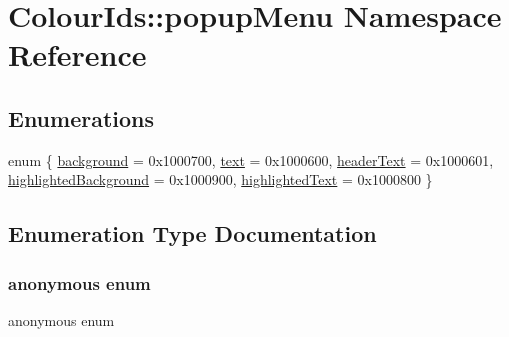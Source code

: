 \hypertarget{namespaceColourIds_1_1popupMenu}{}\section{Colour\+Ids\+:\+:popup\+Menu Namespace Reference}
\label{namespaceColourIds_1_1popupMenu}
\subsection*{Enumerations}
\begin{DoxyCompactItemize}
\item 
enum \{ \newline
\mbox{\hyperlink{namespaceColourIds_1_1popupMenu_ad98555b670c9a9fc093acf5ecaf4fc13a65c427e71c7fdfe391c4f686d64aa4b6}{background}} = 0x1000700, 
\mbox{\hyperlink{namespaceColourIds_1_1popupMenu_ad98555b670c9a9fc093acf5ecaf4fc13a250d63c798ce32b3191ec1a988523d51}{text}} = 0x1000600, 
\mbox{\hyperlink{namespaceColourIds_1_1popupMenu_ad98555b670c9a9fc093acf5ecaf4fc13abf95002460861cca2ca6e1b28d2ad02e}{header\+Text}} = 0x1000601, 
\mbox{\hyperlink{namespaceColourIds_1_1popupMenu_ad98555b670c9a9fc093acf5ecaf4fc13a597c154a82d43adce7a3726a86b4c9de}{highlighted\+Background}} = 0x1000900, 
\newline
\mbox{\hyperlink{namespaceColourIds_1_1popupMenu_ad98555b670c9a9fc093acf5ecaf4fc13a9d99600ef929847b21e564cc47a7b4f7}{highlighted\+Text}} = 0x1000800
 \}
\end{DoxyCompactItemize}


\subsection{Enumeration Type Documentation}
\mbox{\label{namespaceColourIds_1_1popupMenu_ad98555b670c9a9fc093acf5ecaf4fc13}} 
\subsubsection{\texorpdfstring{anonymous enum}{anonymous enum}}
{\footnotesize\ttfamily anonymous enum}

